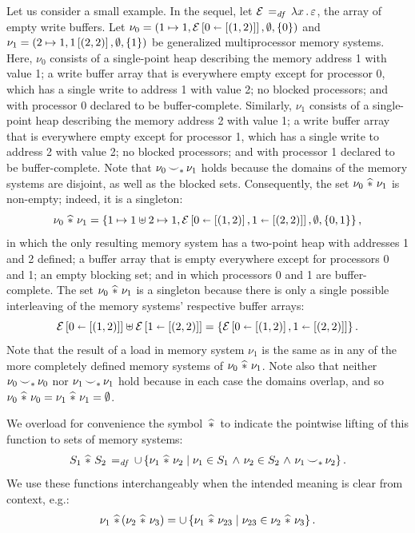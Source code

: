 \documentclass[11pt]{report}
\begin{document}
Let us consider a small example. In the sequel, let $\mathcal{E} \operatorname{\;=_{\mathit{df}}\;} \lambda x\,.\, \varepsilon$, the array of empty write buffers. Let $\nu_0 = (1 \mapsto 1, \mathcal{E} \left[ 0 \shortleftarrow \left[(1,2)\right] \right],\operatorname{\emptyset},\left\lbrace 0 \right\rbrace)$ and $\nu_1 = (2 \mapsto 1, 1 \left[ (2,2) \right],\operatorname{\emptyset},\left\lbrace 1 \right\rbrace)$ be generalized multiprocessor memory systems. Here, $\nu_0$ consists of a single-point heap describing the memory address 1 with value 1; a write buffer array that is everywhere empty except for processor 0, which has a single write to address 1 with value 2; no blocked processors; and with processor 0 declared to be buffer-complete. Similarly, $\nu_1$ consists of a single-point heap describing the memory address 2 with value 1; a write buffer array that is everywhere empty except for processor 1, which has a single write to address 2 with value 2; no blocked processors; and with processor 1 declared to be buffer-complete. Note that $\nu_0 \operatorname{\smile}_\ast \nu_1$ holds because the domains of the memory systems are disjoint, as well as the blocked sets. Consequently, the set $\nu_0 \operatorname{\,\widehat{\ast}\,} \nu_1$ is non-empty; indeed, it is a singleton: \[ \nu_0 \operatorname{\,\widehat{\ast}\,} \nu_1 = \left\lbrace 1 \mapsto 1 \uplus 2 \mapsto 1, \mathcal{E} \left[ 0 \shortleftarrow \left[(1,2)\right], 1 \shortleftarrow \left[(2,2)\right] \right],\operatorname{\emptyset},\left\lbrace 0,1 \right\rbrace \right\rbrace,\] in which the only resulting memory system has a two-point heap with addresses 1 and 2 defined; a buffer array that is empty everywhere except for processors 0 and 1; an empty blocking set; and in which processors 0 and 1 are buffer-complete. The set $\nu_0 \operatorname{\,\widehat{\ast}\,} \nu_1$ is a singleton because there is only a single possible interleaving of the memory systems' respective buffer arrays: \[\mathcal{E} \left[ 0 \shortleftarrow \left[(1,2)\right] \right] \uplus \mathcal{E} \left[ 1 \shortleftarrow \left[(2,2)\right] \right] = \left\lbrace  \mathcal{E} \left[ 0 \shortleftarrow \left[(1,2)\right], 1 \shortleftarrow \left[(2,2)\right] \right] \right\rbrace.\] Note that the result of a load in memory system $\nu_1$ is the same as in any of the more completely defined memory systems of $\nu_0 \operatorname{\,\widehat{\ast}\,} \nu_1$. Note also that neither $\nu_0 \operatorname{\smile}_\ast \nu_0$ nor $\nu_1 \operatorname{\smile}_\ast \nu_1$ hold because in each case the domains overlap, and so $\nu_0 \operatorname{\,\widehat{\ast}\,} \nu_0 = \nu_1 \operatorname{\,\widehat{\ast}\,} \nu_1 = \operatorname{\emptyset}$. 

We overload for convenience the symbol $\operatorname{\,\widehat{\ast}\,}$ to indicate the pointwise lifting of this function to sets of memory systems: \[ S_1 \operatorname{\,\widehat{\ast}\,} S_2 \operatorname{\;=_{\mathit{df}}\;} \cup \left\lbrace \nu_1 \operatorname{\,\widehat{\ast}\,} \nu_2 \mid \nu_1 \in S_1 \operatorname{\,\wedge\,} \nu_2 \in S_2 \operatorname{\,\wedge\,} \nu_1 \operatorname{\smile}_\ast \nu_2 \right\rbrace.\] We use these functions interchangeably when the intended meaning is clear from context, e.g.: \[ \nu_1 \operatorname{\,\widehat{\ast}\,} (\nu_2 \operatorname{\,\widehat{\ast}\,} \nu_3) = \cup \left\lbrace \nu_1 \operatorname{\,\widehat{\ast}\,} \nu_{23} \mid \nu_{23} \in \nu_2 \operatorname{\,\widehat{\ast}\,} \nu_3 \right\rbrace.\] 
\end{document}

